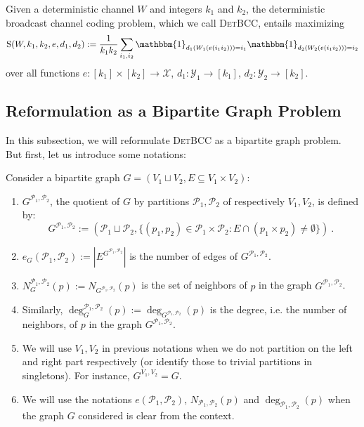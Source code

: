 \begin{definition}
  Given a deterministic channel $W$ and integers $k_1$ and $k_2$, the deterministic broadcast channel coding problem, which we call \textsc{DetBCC}, entails maximizing
  \[ \mathrm{S}(W,k_1,k_2,e,d_1,d_2) := \frac{1}{k_1k_2}\sum_{i_1,i_2}\mathbbm{1}_{d_1(W_1(e(i_1i_2)))=i_1}\mathbbm{1}_{d_2(W_2(e(i_1i_2)))=i_2}\]
  over all functions $e : [k_1] \times [k_2] \rightarrow \mathcal{X}$, $d_1 : \mathcal{Y}_1 \rightarrow [k_1]$,  $d_2 : \mathcal{Y}_2 \rightarrow [k_2]$.
\end{definition}

\subsection{Reformulation as a Bipartite Graph Problem}
In this subsection, we will reformulate \textsc{DetBCC} as a bipartite graph problem. But first, let us introduce some notations:

\begin{definition}
  Consider a bipartite graph $G = (V_1 \sqcup V_2, E \subseteq V_1 \times V_2)$:
  \begin{enumerate}
    \item $G^{\mathcal{P}_1,\mathcal{P}_2}$, the quotient of $G$ by partitions $\mathcal{P}_1,\mathcal{P}_2$ of respectively $V_1,V_2$, is defined by:
      \[ G^{\mathcal{P}_1,\mathcal{P}_2} := \left(\mathcal{P}_1 \sqcup \mathcal{P}_2, \{(p_1,p_2) \in \mathcal{P}_1 \times \mathcal{P}_2: E \cap (p_1 \times p_2) \not= \emptyset\}\right) \ .\]
    \item $e_G(\mathcal{P}_1,\mathcal{P}_2) := |E^{G^{\mathcal{P}_1,\mathcal{P}_2}}|$ is the number of edges of $G^{\mathcal{P}_1,\mathcal{P}_2}$.
    \item $N_G^{\mathcal{P}_1,\mathcal{P}_2}(p) := N_{G^{\mathcal{P}_1,\mathcal{P}_2}}(p)$ is the set of neighbors of $p$ in the graph $G^{\mathcal{P}_1,\mathcal{P}_2}$.
    \item Similarly, $\deg_G^{\mathcal{P}_1,\mathcal{P}_2}(p) := \deg_{G^{\mathcal{P}_1,\mathcal{P}_2}}(p)$ is the degree, i.e. the number of neighbors, of $p$ in the graph $G^{\mathcal{P}_1,\mathcal{P}_2}$.
    \item We will use $V_1,V_2$ in previous notations when we do not partition on the left and right part respectively (or identify those to trivial partitions in singletons). For instance, $G^{V_1,V_2}=G$.
    \item We will use the notations $e(\mathcal{P}_1,\mathcal{P}_2)$, $N_{\mathcal{P}_1,\mathcal{P}_2}(p)$  and $\deg_{\mathcal{P}_1,\mathcal{P}_2}(p)$ when the graph $G$ considered is clear from the context.
  \end{enumerate}
\end{definition}

